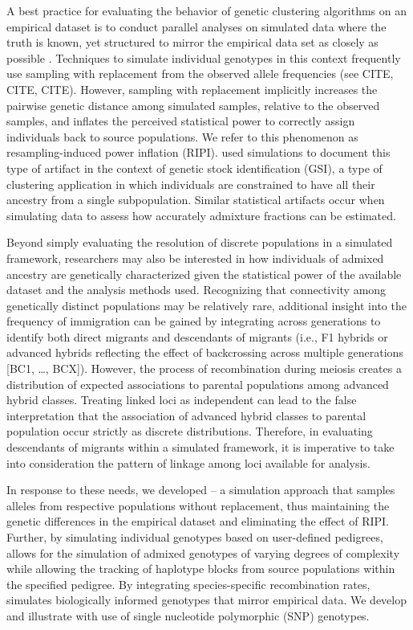 A best practice for evaluating the behavior of genetic clustering algorithms on an empirical dataset is to conduct
parallel analyses on simulated data where the truth is known, yet structured to mirror the empirical data set
as closely as possible \citep{vaha2006efficiency,anderson2008improved,latch2011fine}.
Techniques to simulate individual genotypes in this context frequently use sampling with replacement from the
observed allele frequencies (see CITE, CITE, CITE).
However, sampling with replacement implicitly increases the pairwise genetic distance among simulated samples, relative to the observed
samples, and
inflates the perceived statistical power to correctly assign individuals back to source populations. 
We refer to this phenomenon as resampling-induced power inflation (RIPI).
\citet{anderson2008improved} used simulations to document this type of artifact in the context of 
genetic stock identification (GSI), a type of clustering application in which individuals are constrained to have
all their ancestry from a single subpopulation.
Similar statistical artifacts occur when simulating data to
assess how accurately admixture fractions can be estimated. 


Beyond simply evaluating the resolution of discrete populations in a simulated framework, researchers may also be
interested in how individuals of admixed ancestry are genetically characterized given the statistical power of the available dataset and the
analysis methods used.
Recognizing that connectivity among genetically distinct populations may be relatively rare, additional insight into the
frequency of immigration can be gained by integrating across generations to identify both direct migrants and descendants of migrants
 (i.e., F1 hybrids or advanced hybrids reflecting the effect of backcrossing across multiple generations [BC1, \ldots,
BCX]).
However, the process of recombination during meiosis creates a distribution of expected associations to parental populations among
advanced hybrid classes.
Treating linked loci as independent can lead to the false interpretation that the association of advanced hybrid classes to parental population
occur strictly as discrete distributions.
Therefore, in evaluating descendants of migrants within a simulated framework, it is imperative to take into consideration the pattern of
linkage among loci available for analysis.

In response to these needs, we developed \gscramble{} – a simulation approach that samples alleles from respective populations without
replacement, thus maintaining the genetic differences in the empirical dataset and eliminating the effect of RIPI.
Further, by simulating individual genotypes based on user-defined pedigrees, \gscramble{} allows for the simulation of admixed genotypes of
varying degrees of complexity while allowing the tracking of haplotype blocks from source populations within the specified pedigree.
By integrating species-specific recombination rates, \gscramble{} simulates biologically informed genotypes that mirror empirical data.
We develop and illustrate \gscramble{} with use of single nucleotide polymorphic (SNP) genotypes.




